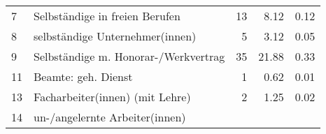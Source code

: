 \begin{longtable}{lXrrr}
     7 &
     \multicolumn{1}{X}{ Selbständige in freien Berufen   } &


       \num{13} &
       \num[round-mode=places,round-precision=2]{8,12} &
         \num[round-mode=places,round-precision=2]{0,12} \\

     8 &
     \multicolumn{1}{X}{ selbständige Unternehmer(innen)   } &


       \num{5} &
       \num[round-mode=places,round-precision=2]{3,12} &
         \num[round-mode=places,round-precision=2]{0,05} \\

     9 &
     \multicolumn{1}{X}{ Selbständige m. Honorar-/Werkvertrag   } &


       \num{35} &
       \num[round-mode=places,round-precision=2]{21,88} &
         \num[round-mode=places,round-precision=2]{0,33} \\

     11 &
     \multicolumn{1}{X}{ Beamte: geh. Dienst   } &


       \num{1} &
       \num[round-mode=places,round-precision=2]{0,62} &
         \num[round-mode=places,round-precision=2]{0,01} \\

     13 &
     \multicolumn{1}{X}{ Facharbeiter(innen) (mit Lehre)   } &


       \num{2} &
       \num[round-mode=places,round-precision=2]{1,25} &
         \num[round-mode=places,round-precision=2]{0,02} \\

     14 &
     \multicolumn{1}{X}{ un-/angelernte Arbeiter(innen)   } &



\end{longtable}
